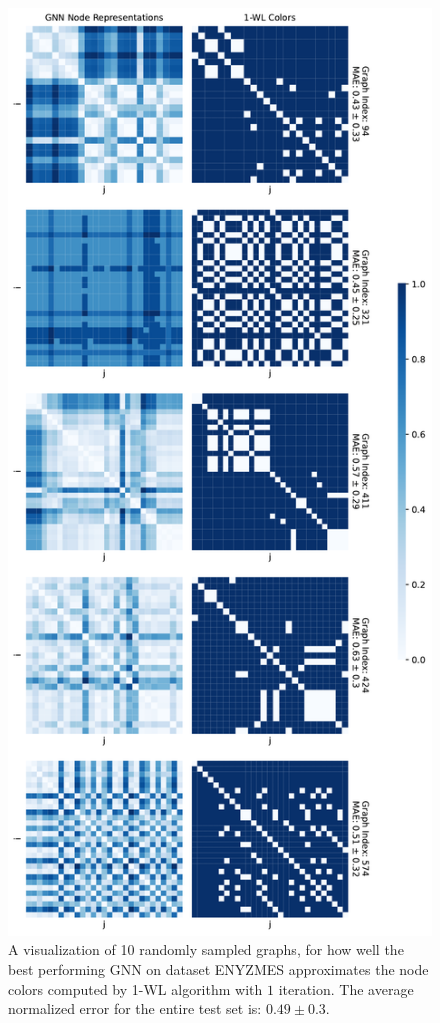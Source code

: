 \begin{figure}[!ht]
\begin{minipage}[b]{0.45992852703\textwidth}
    \end{minipage}
    \hfill
    \begin{minipage}[b]{0.53007147296\textwidth}
        \includegraphics[width=\textwidth, right]{Figures/heatmaps_ENZYMES_1.pdf}
    \end{minipage}
    \hfill
    \caption{A visualization of 10 randomly sampled graphs, for how well the best performing GNN on dataset ENYZMES approximates the node colors computed by 1-WL algorithm with $1$ iteration. The average normalized error for the entire test set is: $0.49 ± 0.3$.}
\end{figure}

